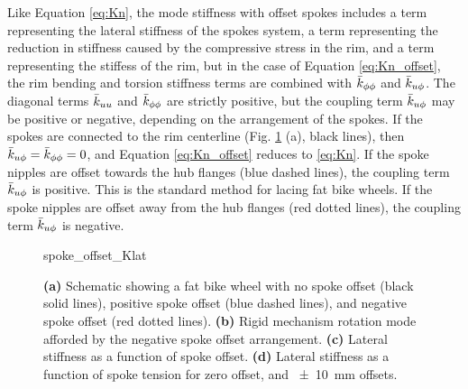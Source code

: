\documentclass[\rootdir/thesis.tex]{subfiles}
\begin{document}
Like Equation \eqref{eq:Kn}, the mode stiffness with offset spokes includes a term representing the lateral stiffness of the spokes system, a term representing the reduction in stiffness caused by the compressive stress in the rim, and a term representing the stiffess of the rim, but in the case of Equation \eqref{eq:Kn_offset}, the rim bending and torsion stiffness terms are combined with $\bar{k}_{\phi\phi}$ and $\bar{k}_{u\phi}$. The diagonal terms $\bar{k}_{uu}$ and $\bar{k}_{\phi\phi}$ are strictly positive, but the coupling term $\bar{k}_{u\phi}$ may be positive or negative, depending on the arrangement of the spokes. If the spokes are connected to the rim centerline (Fig. \ref{fig:spoke_offset} (a), black lines), then $\bar{k}_{u\phi}=\bar{k}_{\phi\phi}=0$, and Equation \eqref{eq:Kn_offset} reduces to \eqref{eq:Kn}. If the spoke nipples are offset towards the hub flanges (blue dashed lines), the coupling term $\bar{k}_{u\phi}$ is positive. This is the standard method for lacing fat bike wheels. If the spoke nipples are offset away from the hub flanges (red dotted lines), the coupling term $\bar{k}_{u\phi}$ is negative.



\begin{figure}[t]
\centering
{spoke_offset_Klat}
\caption{\textbf{(a)} Schematic showing a fat bike wheel with no spoke offset (black solid lines), positive spoke offset (blue dashed lines), and negative spoke offset (red dotted lines). \textbf{(b)} Rigid mechanism rotation mode afforded by the negative spoke offset arrangement. \textbf{(c)} Lateral stiffness as a function of spoke offset. \textbf{(d)} Lateral stiffness as a function of spoke tension for zero offset, and \SI{+-10}{mm} offsets.}
\label{fig:spoke_offset}
\end{figure}

\inprogress

\end{document}
